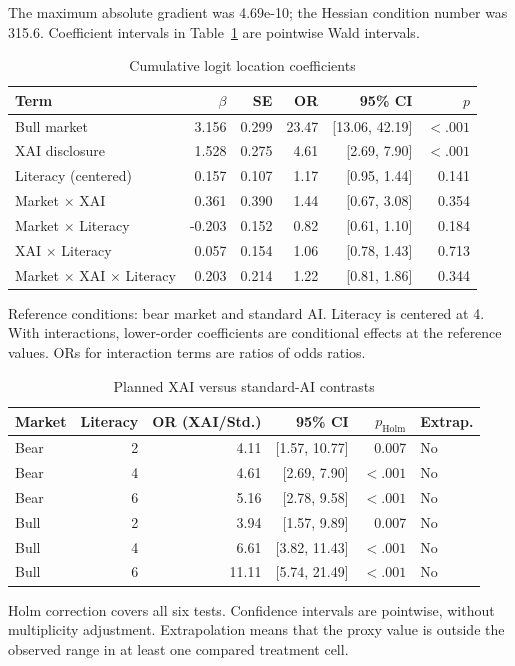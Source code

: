 The maximum absolute gradient was 4.69e-10; the Hessian condition number was 315.6. Coefficient intervals in Table~\ref{tab:coefficients} are pointwise Wald intervals.

\begin{table}[htbp]
\centering
\small
\caption{Cumulative logit location coefficients\label{tab:coefficients}}
\begin{tabular}{lrrrrr}
\toprule
Term & $\beta$ & SE & OR & 95\% CI & $p$\\
\midrule
Bull market & 3.156 & 0.299 & 23.47 & [13.06, 42.19] & $<.001$\\
XAI disclosure & 1.528 & 0.275 & 4.61 & [2.69, 7.90] & $<.001$\\
Literacy (centered) & 0.157 & 0.107 & 1.17 & [0.95, 1.44] & 0.141\\
Market $\times$ XAI & 0.361 & 0.390 & 1.44 & [0.67, 3.08] & 0.354\\
Market $\times$ Literacy & -0.203 & 0.152 & 0.82 & [0.61, 1.10] & 0.184\\
XAI $\times$ Literacy & 0.057 & 0.154 & 1.06 & [0.78, 1.43] & 0.713\\
Market $\times$ XAI $\times$ Literacy & 0.203 & 0.214 & 1.22 & [0.81, 1.86] & 0.344\\
\bottomrule
\end{tabular}
\par\smallskip
\begin{minipage}{.96\linewidth}\footnotesize Reference conditions: bear market and standard AI. Literacy is centered at 4. With interactions, lower-order coefficients are conditional effects at the reference values. ORs for interaction terms are ratios of odds ratios.\end{minipage}
\end{table}

\begin{table}[htbp]
\centering
\small
\caption{Planned XAI versus standard-AI contrasts}
\begin{tabular}{lrrrrl}
\toprule
Market & Literacy & OR (XAI/Std.) & 95\% CI & $p_{\mathrm{Holm}}$ & Extrap.\\
\midrule
Bear & 2 & 4.11 & [1.57, 10.77] & 0.007 & No\\
Bear & 4 & 4.61 & [2.69, 7.90] & $<.001$ & No\\
Bear & 6 & 5.16 & [2.78, 9.58] & $<.001$ & No\\
Bull & 2 & 3.94 & [1.57, 9.89] & 0.007 & No\\
Bull & 4 & 6.61 & [3.82, 11.43] & $<.001$ & No\\
Bull & 6 & 11.11 & [5.74, 21.49] & $<.001$ & No\\
\bottomrule
\end{tabular}
\par\smallskip
\begin{minipage}{.96\linewidth}\footnotesize Holm correction covers all six tests. Confidence intervals are pointwise, without multiplicity adjustment. Extrapolation means that the proxy value is outside the observed range in at least one compared treatment cell.\end{minipage}
\end{table}

